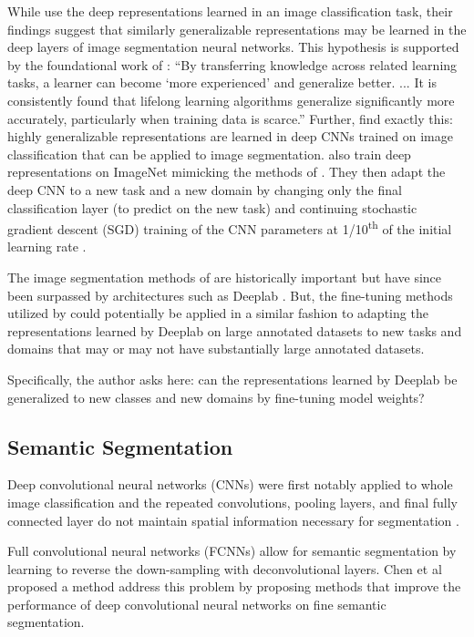 \documentclass[10pt,twocolumn,letterpaper]{article}
\begin{document}
 While \citet{donahue2014decaf} use the deep representations learned in an image classification task, their findings suggest that similarly generalizable representations
 may be learned in the deep layers of image segmentation neural networks. This hypothesis is supported by the foundational work of \citet{thrun1996learning}:
  \enquote{By transferring knowledge across related learning tasks, a learner can become \enquote{more experienced} and generalize better.
  ... It is consistently found that lifelong learning algorithms generalize significantly more accurately, particularly when training data is scarce.}
  Further, \citet{girshick2014rich} find exactly this: highly generalizable representations are learned in deep CNNs trained on image classification that can be applied to
  image segmentation. \citet{girshick2014rich} also train deep representations on ImageNet \cite{deng2009imagenet} mimicking the methods of \citet{krizhevsky2012imagenet}.
  They then adapt the deep CNN to a new task and a new domain by changing only the final classification layer (to predict on the new task) and
  continuing stochastic gradient descent (SGD) training of the CNN parameters at 1/10\textsuperscript{th} of the initial learning rate \cite{girshick2014rich}.

  The image segmentation methods of \citet{girshick2014rich} are historically important but have since been surpassed by architectures such as Deeplab \cite{chen2018deeplab}.
  But, the fine-tuning methods utilized by \citet{girshick2014rich} could potentially be applied in a similar fashion to adapting the representations learned by Deeplab
  on large annotated datasets to new tasks and domains that may or may not have substantially large annotated datasets.

  Specifically, the author asks here: can the representations learned by Deeplab be generalized to new classes and new domains by fine-tuning model weights?


\subsection{Semantic Segmentation}
Deep convolutional neural networks (CNNs) were first notably applied to whole image classification and the repeated convolutions, pooling layers,
and final fully connected layer do not maintain spatial information necessary for segmentation \cite{marmanis2016semantic}.

Full convolutional neural networks (FCNNs) allow for semantic segmentation by learning to reverse the down-sampling with deconvolutional layers.
Chen et al proposed a method \cite{chen2018deeplab} address this problem by proposing methods that improve the performance of
deep convolutional neural networks on fine semantic segmentation.
\end{document}
